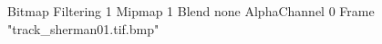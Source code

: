 {Bitmap
	{Filtering 1}
	{Mipmap 1}
	{Blend none}
	{AlphaChannel 0}
	{Frame "track_sherman01.tif.bmp"}
}
